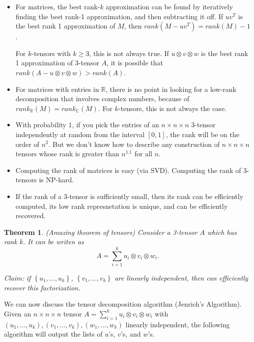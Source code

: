 \documentclass[12pt]{article}
\newtheorem*{theorem}{Theorem}
\newcommand{\RR}{\mathbb{R}}
\def\CC{\mathbb{C}}
\begin{document}
\begin{itemize}
  \item For matrices, the best rank-$k$ approximation can be found by iteratively finding the best rank-1 approximation, and then subtracting it off.  If $uv^T$ is the best rank 1 approximation of $M$, then $rank(M - uv^T) = rank(M)-1$.

    For $k$-tensors with $k \geq 3$, this is not always true.  If $u \otimes v \otimes w$ is the best rank 1 approximation of 3-tensor $A$, it is possible that $rank(A - u \otimes v \otimes w) > rank(A)$.

  \item For matrices with entries in $\RR$, there is no point in looking for a low-rank decomposition that involves complex numbers, because of $rank_{\RR}(M) = rank_{\CC}(M)$.  For $k$-tensors, this is not always the case.

  \item With probability $1$, if you pick the entries of an $n \times n \times n$ 3-tensor independently at random from the interval $[0, 1]$, the rank will be on the order of $n^2$.  But we don't know how to describe any construction of $n \times n \times n$ tensors whose rank is greater than $n^{1.1}$ for all $n$.

  \item Computing the rank of matrices is easy (via SVD).  Computing the rank of 3-tensors is NP-hard.

  \item If the rank of a 3-tensor is sufficiently small, then its rank can be efficiently computed, its low rank represnetation is unique, and can be efficiently recovered.
\end{itemize}

\begin{theorem} (Amazing theorem of tensors) Consider a 3-tensor $A$ which has rank $k$.  It can be writen as
  \[
    A = \sum_{i=1}^{k} u_i \otimes v_i \otimes w_i.
  \]

  Claim: if $\left\{ u_1, \dots, u_k \right\}$, $\left\{ v_1, \dots, v_k \right\}$ are linearly independent, then can efficiently recover this factorization.
\end{theorem}

We can now discuss the tensor decomposition algorithm (Jenrich's Algorithm).  Given an $n \times n \times n$ tensor $A = \sum_{i=1}^{k} u_i \otimes v_i \otimes w_i$ with $(u_1, \dots, u_k), (v_1, \dots, v_k), (w_1, \dots, w_k)$ linearly independent, the following algorithm will output the lists of $u$'s, $v$'s, and $w$'s.
\end{document}
